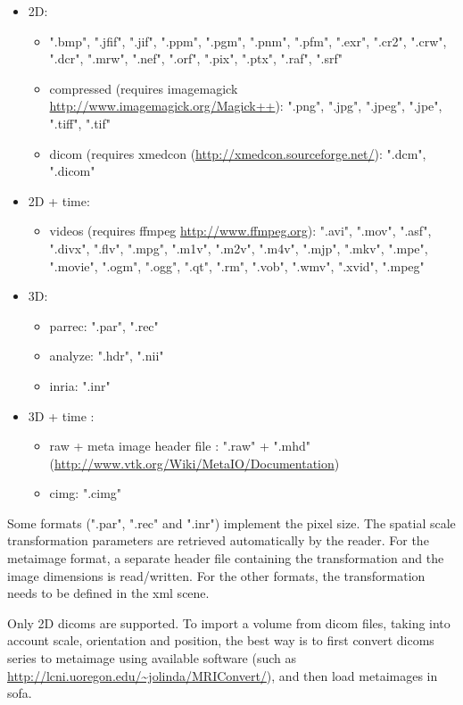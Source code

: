 \begin{itemize}
\item 2D:
	\begin{itemize}
	\item ".bmp", ".jfif", ".jif", ".ppm", ".pgm", ".pnm", ".pfm", ".exr", ".cr2", ".crw", ".dcr", ".mrw", ".nef", ".orf", ".pix", ".ptx", ".raf", ".srf"
	\item compressed (requires imagemagick \url{http://www.imagemagick.org/Magick++}): ".png", ".jpg", ".jpeg", ".jpe", ".tiff", ".tif"
	\item dicom (requires xmedcon (\url{http://xmedcon.sourceforge.net/}): ".dcm", ".dicom"
	\end{itemize}
\item 2D + time:
	\begin{itemize}
	\item videos (requires ffmpeg \url{http://www.ffmpeg.org}): ".avi", ".mov", ".asf", ".divx", ".flv", ".mpg", ".m1v", ".m2v", ".m4v", ".mjp", ".mkv", ".mpe", ".movie", ".ogm", ".ogg", ".qt", ".rm", ".vob", ".wmv", ".xvid", ".mpeg"	
	\end{itemize}
\item 3D:
	\begin{itemize}
	\item parrec: ".par", ".rec"
	\item analyze: ".hdr", ".nii"
	\item inria: ".inr"
	\end{itemize}
\item 3D + time :
	\begin{itemize}
	\item raw + meta image header file : ".raw" + ".mhd" (\url{http://www.vtk.org/Wiki/MetaIO/Documentation})
	\item cimg: ".cimg"
	\end{itemize}
\end{itemize}

\noindent Some formats (".par", ".rec" and ".inr") implement the pixel size. The spatial scale transformation parameters are retrieved automatically by the reader. For the metaimage format, a separate header file containing the transformation and the image dimensions is read/written. For the other formats, the transformation needs to be defined in the xml scene.

\noindent Only 2D dicoms are supported. To import a volume from dicom files, taking into account scale, orientation and position, the best way is to first convert dicoms series to metaimage using available software  (such as \url{http://lcni.uoregon.edu/~jolinda/MRIConvert/}), and then load metaimages in sofa.

